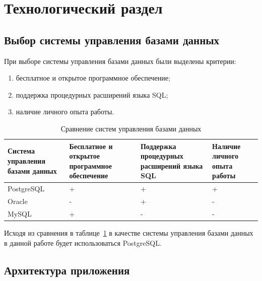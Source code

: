 \section{Технологический раздел}

\subsection{Выбор системы управления базами данных}

При выборе системы управления базами данных были выделены критерии:
\begin{enumerate}[label*=---]
	\item бесплатное и открытое программное обеспечение;
	\item поддержка процедурных расширений языка SQL;
	\item наличие личного опыта работы.
\end{enumerate}

\begin{table}[hbtp]
	\begin{center}
		\begin{flushleft}
			\captionsetup{justification=raggedright, singlelinecheck=false}
			\caption{\label{tab:bd}Сравнение систем управления базами данных}
		\end{flushleft}
		\begin{tabular}{|  p{} | p{} | p{}  |  p{}|} 
			\hline  Система управления базами данных & Бесплатное и открытое программное обеспечение & Поддержка процедурных расширений языка SQL  &  Наличие личного опыта работы \\ \hline
			PostgreSQL~\cite{postgres} &     + & + & + \\ \hline
			Oracle~\cite{oracleReal} &   -  &   + & -  \\ \hline
			MySQL~\cite{mysql} &  + &  - & - \\ \hline
		\end{tabular}
	\end{center}
\end{table}

Исходя из сравнения в таблице~\ref{tab:bd} в качестве системы управления базами данных в данной работе будет использоваться PostgreSQL.

\subsection{Архитектура приложения}

